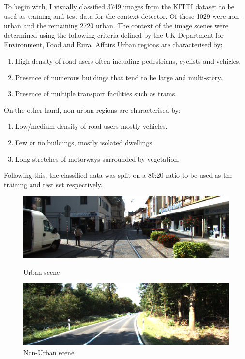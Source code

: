 To begin with, I visually classified 3749 images from the KITTI dataset to be used as training and test data for the context detector. Of these 1029 were non-urban and the remaining 2720 urban. 
The context of the image scenes were determined using the following criteria defined by the UK Department for Environment, Food and Rural Affairs \cite{2011ruralurbanclassification}
\noindent
Urban regions are characterised by:
\begin{enumerate}
	\item High density of road users often including pedestrians, cyclists and vehicles. 
	\item Presence of numerous  buildings that tend to be large and multi-story. 
	\item Presence of multiple transport facilities such as trams. 
\end{enumerate}

\noindent
On the other hand, non-urban regions are characterised by: 
\begin{enumerate}
	\item Low/medium density of road users mostly vehicles.
	\item Few or no buildings, mostly isolated dwellings.
	\item Long stretches of motorways surrounded by vegetation. 
\end{enumerate}

Following this, the classified data was split on a 80:20 ratio to be used as the training and test set respectively. 

\begin{figure}[h]
	\centering
	\begin{minipage}[b]{0.4\textwidth}
		\includegraphics[width=\textwidth]{images/urban.png}
		\caption{Urban scene}
	\end{minipage}
	\hfill
	\begin{minipage}[b]{0.4\textwidth}
		\includegraphics[width=\textwidth]{images/non_urban.png}
		\caption{Non-Urban scene}
	\end{minipage}
\end{figure}



